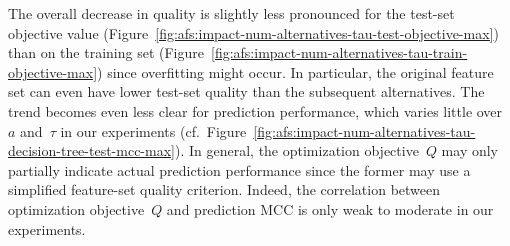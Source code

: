 \documentclass{article}
\theoremstyle{definition}
\begin{document}
The overall decrease in quality is slightly less pronounced for the test-set objective value (Figure~\ref{fig:afs:impact-num-alternatives-tau-test-objective-max}) than on the training set (Figure~\ref{fig:afs:impact-num-alternatives-tau-train-objective-max}) since overfitting might occur.
In particular, the original feature set can even have lower test-set quality than the subsequent alternatives.
The trend becomes even less clear for prediction performance, which varies little over~$a$ and~$\tau$ in our experiments (cf.~Figure~\ref{fig:afs:impact-num-alternatives-tau-decision-tree-test-mcc-max}).
In general, the optimization objective~$Q$ may only partially indicate actual prediction performance since the former may use a simplified feature-set quality criterion.
Indeed, the correlation between optimization objective~$Q$ and prediction MCC is only weak to moderate in our experiments.
\end{document}

